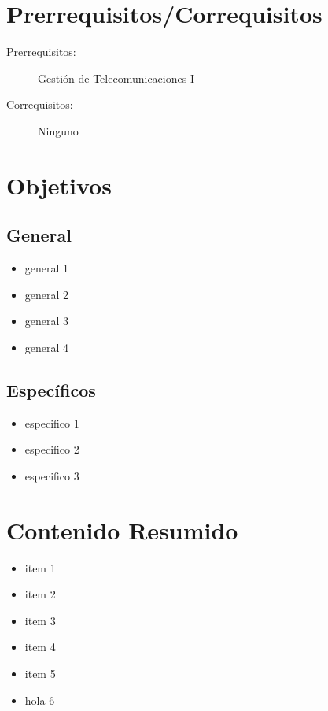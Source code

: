 \documentclass[11pt]{article}
\begin{document}
\section*{Prerrequisitos/Correquisitos}
\begin{description}
\item [Prerrequisitos:] Gestión de Telecomunicaciones I
\item[Correquisitos:] Ninguno
\end{description}

\section*{Objetivos}

\subsection*{General}

\begin{itemize}
\item general 1 \item general 2  \item general 3 \item general 4 
\end{itemize}

\subsection*{Específicos}

\begin{itemize}
\item especifico 1 \item especifico 2  \item especifico 3  
\end{itemize}

\section*{Contenido Resumido}

\begin{itemize}
\item item 1 \item  item 2  \item  item 3  \item  item 4  \item  item 5  \item hola 6 
\end{itemize}
\end{document}
